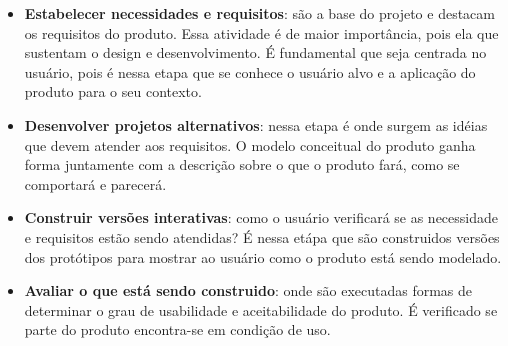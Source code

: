 \begin{itemize}
	\item \textbf{Estabelecer necessidades e requisitos}: são a base do projeto e destacam os requisitos do produto. Essa atividade é de maior importância, pois ela que sustentam o design e desenvolvimento. É fundamental que seja centrada no usuário, pois é nessa etapa que se conhece o usuário alvo e a aplicação do produto para o seu contexto.
	\item \textbf{Desenvolver projetos alternativos}: nessa etapa é onde surgem as idéias que devem atender aos requisitos. O modelo conceitual do produto ganha forma juntamente com a descrição sobre o que o produto fará, como se comportará e parecerá.
	\item \textbf{Construir versões interativas}: como o usuário verificará se as necessidade e requisitos estão sendo atendidas? É nessa etápa que são construidos versões dos protótipos para mostrar ao usuário como o produto está sendo modelado.
	\item \textbf{Avaliar o que está sendo construido}: onde são executadas formas de determinar o grau de usabilidade e aceitabilidade do produto. É verificado se parte do produto encontra-se em condição de uso.
\end{itemize}
